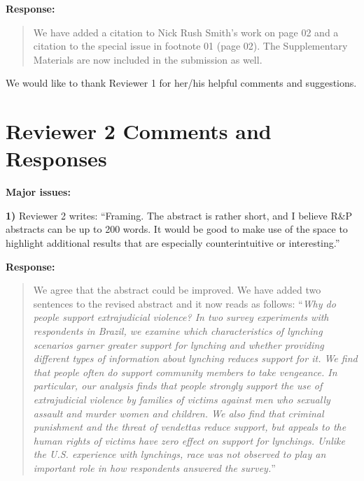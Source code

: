 \documentclass[a4paper,12pt]{article}
\begin{document}
\noindent \textbf{Response:} 
\begin{quote}

We have added a citation to Nick Rush Smith's work on page 02 and a citation to
the special issue in footnote 01 (page 02). The Supplementary
Materials are now included in the submission as well.

\end{quote}

\vspace{.3cm}

We would like to thank Reviewer 1 for her/his helpful comments and suggestions.

\section*{Reviewer 2 Comments and Responses}

\textbf{Major issues:}

\noindent \textbf{1)} Reviewer 2 writes: ``Framing. The abstract is rather
short, and I believe R&P abstracts can be up to 200 words. It would be good to
make use of the space to highlight additional results that are especially
counterintuitive or interesting.''

\vspace{.3cm}

\noindent \textbf{Response:} 
\begin{quote}

We agree that the abstract could be improved. We have added two sentences to
the revised abstract and it now reads as follows: ``\textit{Why do people
support extrajudicial violence? In two survey experiments with respondents in
Brazil, we examine which characteristics of lynching scenarios garner greater
support for lynching and whether providing different types of information about
lynching reduces support for it. We find that people often do support community
members to take vengeance. In particular, our analysis finds that people
strongly support the use of extrajudicial violence by families of victims
against men who sexually assault and murder women and children. We also find
that criminal punishment and the threat of vendettas reduce support, but
appeals to the human rights of victims have zero effect on support for
lynchings. Unlike the U.S. experience with lynchings, race was not observed to
play an important role in how respondents answered the survey.}''

\end{quote}
\end{document}
